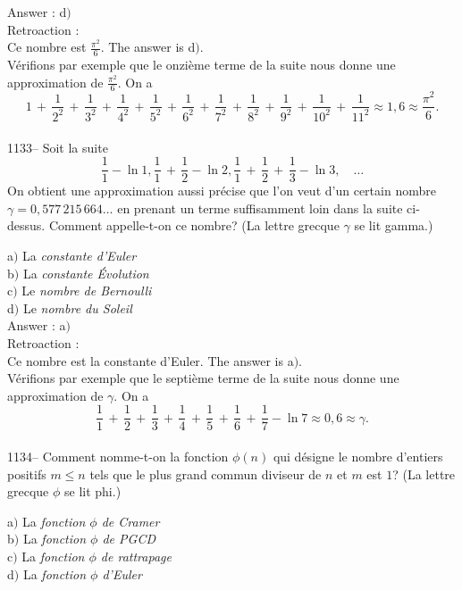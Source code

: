 ﻿\documentclass[letterpaper, 12pt]{article}
\begin{document}
Answer : d$)$\\

Retroaction : \\
Ce nombre est $\frac{\pi^2}6$. The answer is d$)$.\\
V\'erifions
par exemple que le onzi\`eme terme de la suite nous donne une
approximation de $\frac{\pi^2}6$. On a
$$\displaystyle{1\,+\,\frac1{2^2}\,+\,\frac1{3^2}\,+\,\frac1{4^2}\,+\,\frac1{5^2}\,+\,\frac1{6^2}\,+\,\frac1{7^2}
\,+\,\frac1{8^2}\,+\,\frac1{9^2}\,+\,\frac1{10^2}\,+\,\frac1{11^2}\approx1,6\approx\frac{\pi^2}6}.$$\\

1133-- Soit la suite
$$\displaystyle{\frac11-\ln1,\frac11\,+\,\frac12-\ln2,\frac11\,+\,\frac12\,+\,\frac13-\ln3},\quad\ldots$$
On obtient une approximation aussi pr\'ecise que l'on veut d'un
certain nombre $\gamma=0,577\,215\,664\ldots$ en prenant un terme
suffisamment loin dans la suite ci-dessus. Comment appelle-t-on ce
nombre? (La lettre grecque $\gamma$ se lit gamma.)

a$)$ La {\sl constante d'Euler}\\
b$)$ La {\sl constante \'Evolution} \\
c$)$ Le {\sl nombre de Bernoulli} \\
d$)$ Le {\sl nombre du Soleil}\\

Answer : a$)$\\

Retroaction : \\
Ce nombre est la constante d'Euler. The answer is
a$)$.\\
V\'erifions par exemple que le septi\`eme terme de la suite
nous donne une approximation de $\gamma$. On a
$$\displaystyle{\frac11\,+\,\frac12\,+\,\frac13\,+\,\frac14\,+\,\frac15\,+\,\frac16\,+\,\frac17-\ln7}
\approx0,6\approx\gamma.$$\\

1134-- Comment nomme-t-on la fonction $\phi(n)$ qui d\'esigne le
nombre d'entiers positifs $m\le n$ tels que le plus grand commun
diviseur de $n$ et $m$ est $1$? (La lettre grecque $\phi$ se lit
phi.)

a$)$ La {\sl fonction $\phi$ de Cramer} \\
b$)$ La {\sl fonction $\phi$ de PGCD}   \\
c$)$ La {\sl fonction $\phi$ de rattrapage} \\
d$)$ La {\sl fonction $\phi$ d'Euler}\\
\end{document}
